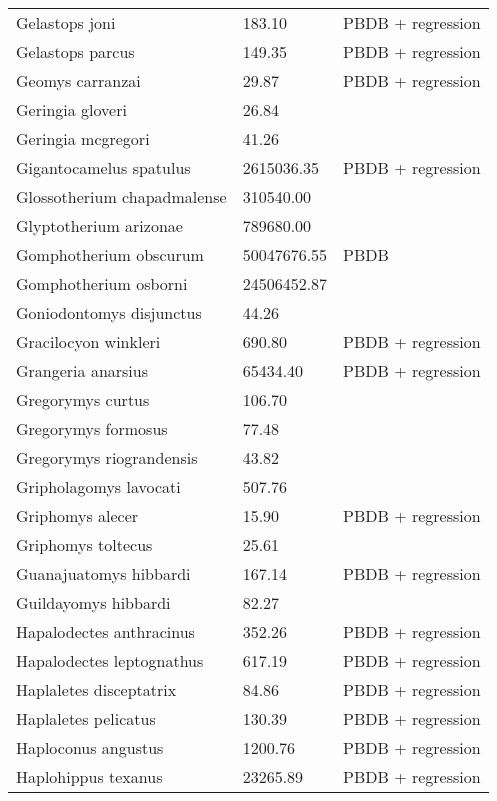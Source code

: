 \documentclass{article}
\begin{document}
\begin{center}
\begin{longtable}{p{} p{} p{}}
    Gelastops joni & 183.10 & PBDB + regression \\ 
    Gelastops parcus & 149.35 & PBDB + regression \\ 
    Geomys carranzai & 29.87 & PBDB + regression \\ 
    Geringia gloveri & 26.84 & \cite{Tomiya2013} \\ 
    Geringia mcgregori & 41.26 & \cite{Tomiya2013} \\ 
    Gigantocamelus spatulus & 2615036.35 & PBDB + regression \\ 
    Glossotherium chapadmalense & 310540.00 & \cite{McDonald2005} \\ 
    Glyptotherium arizonae & 789680.00 & \cite{McDonald2005} \\ 
    Gomphotherium obscurum & 50047676.55 & PBDB \\ 
    Gomphotherium osborni & 24506452.87 & \cite{Wang2014} \\ 
    Goniodontomys disjunctus & 44.26 & \cite{Tomiya2013} \\ 
    Gracilocyon winkleri & 690.80 & PBDB + regression \\ 
    Grangeria anarsius & 65434.40 & PBDB + regression \\ 
    Gregorymys curtus & 106.70 & \cite{Tomiya2013} \\ 
    Gregorymys formosus & 77.48 & \cite{Tomiya2013} \\ 
    Gregorymys riograndensis & 43.82 & \cite{Tomiya2013} \\ 
    Gripholagomys lavocati & 507.76 & \cite{Tomiya2013} \\ 
    Griphomys alecer & 15.90 & PBDB + regression \\ 
    Griphomys toltecus & 25.61 & \cite{Mihlbachler2006} \\ 
    Guanajuatomys hibbardi & 167.14 & PBDB + regression \\ 
    Guildayomys hibbardi & 82.27 & \cite{Tomiya2013} \\ 
    Hapalodectes anthracinus & 352.26 & PBDB + regression \\ 
    Hapalodectes leptognathus & 617.19 & PBDB + regression \\ 
    Haplaletes disceptatrix & 84.86 & PBDB + regression \\ 
    Haplaletes pelicatus & 130.39 & PBDB + regression \\ 
    Haploconus angustus & 1200.76 & PBDB + regression \\ 
    Haplohippus texanus & 23265.89 & PBDB + regression \\ 

\end{longtable}
\end{center}
\end{document}
